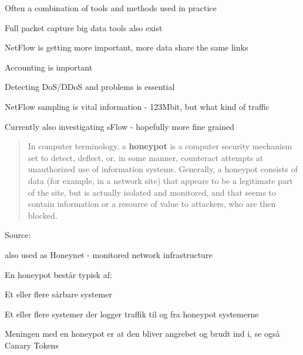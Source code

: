 \documentclass[Screen16to9,17pt]{foils}
\begin{document}
\vskip 5mm
\centerline{Often a combination of tools and methods used in practice}

Full packet capture big data tools also exist


\begin{slidelist}
\item NetFlow is getting more important, more data share the same links
\item Accounting is important
\item Detecting DoS/DDoS and problems is essential
\item NetFlow sampling is vital information - 123Mbit, but what kind of traffic
\item Currently also investigating sFlow - hopefully more fine grained
\end{slidelist}



\vskip 1cm
\begin{quote}
In computer terminology, a {\bf honeypot} is a computer security mechanism set to detect, deflect, or, in some manner, counteract attempts at unauthorized use of information systems. Generally, a honeypot consists of data (for example, in a network site) that appears to be a legitimate part of the site, but is actually isolated and monitored, and that seems to contain information or a resource of value to attackers, who are then blocked.
\end{quote}

Source:

also used as Honeynet - monitored network infrastructure

\begin{list1}
\item En honeypot består typisk af:
  \begin{list2}
    \item Et eller flere sårbare systemer
\item Et eller flere systemer der logger traffik til og fra honeypot
  systemerne
  \end{list2}
\item Meningen med en honeypot er at den bliver angrebet og brudt ind
  i, se også Canary Tokens
\end{list1}



\end{document}
